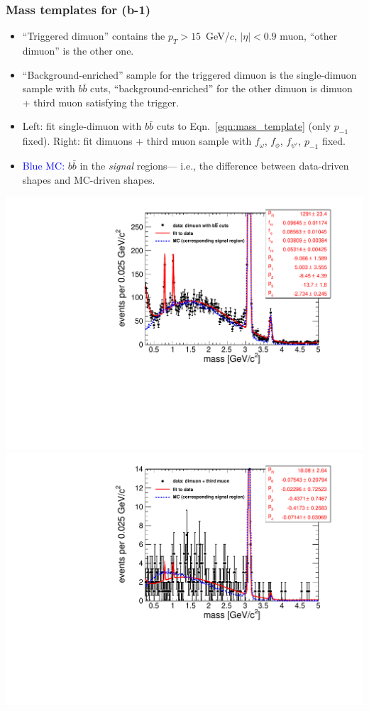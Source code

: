 \documentclass[compress]{beamer}
\begin{document}
\begin{frame}
\frametitle{Mass templates for (b-1)}

\begin{itemize}
\item ``Triggered dimuon'' contains the $p_T > 15$~GeV/$c$, $|\eta| <
  0.9$ muon, ``other dimuon'' is the other one.

\item ``Background-enriched'' sample for the triggered dimuon is the
  single-dimuon sample with $b\bar{b}$ cuts, ``background-enriched''
  for the other dimuon is dimuon + third muon satisfying the trigger.

\item Left: fit single-dimuon with $b\bar{b}$ cuts to
  Eqn.~\ref{eqn:mass_template} (only $p_{-1}$ fixed).  Right: fit
  dimuons + third muon sample with $f_\omega$, $f_\phi$, $f_{\psi'}$,
  $p_{-1}$ fixed.

\item \textcolor{blue}{Blue MC:} $b\bar{b}$ in the {\it signal}
  regions--- i.e., the difference between data-driven shapes and
  MC-driven shapes.
\end{itemize}

\includegraphics[width=0.5\linewidth]{backgroundEnriched_massC.pdf}
\includegraphics[width=0.5\linewidth]{backgroundEnriched_massF.pdf}
\end{frame}
\end{document}
